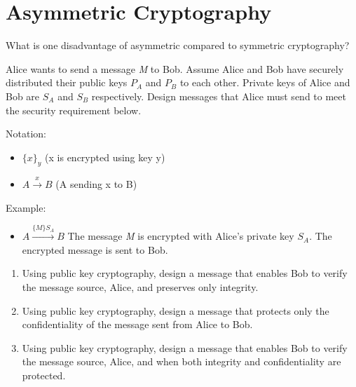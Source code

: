 \newpage
\section{Asymmetric Cryptography}

 {What is one disadvantage of asymmetric compared to symmetric cryptography?}\eprob
\vspace*{0.5in}


Alice wants to send a message \textit{M} to Bob. Assume Alice and Bob
have securely distributed their public keys $P_A$ and $P_B$ to
each other. Private keys of Alice and Bob are $S_A$ and $S_B$
respectively. Design messages that Alice must send to meet the security
requirement below.

Notation: 
\begin{itemize}
\item $\{x\}_y$ (x is encrypted using key y) 
\item $A \xrightarrow{x} B$ (A sending x to B)
\end{itemize}

Example:
\begin{itemize}
\item $A \xrightarrow{\{M\}{S_A}} B$ The message
  \textit{M} is encrypted with Alice's private
  key $S_A$. The encrypted message is sent to Bob.
\end{itemize}

\begin{enumerate}

\item Using public key cryptography, design a message that enables Bob to
verify the message source, Alice, and preserves only integrity.


\item Using public key cryptography, design a message that protects only the
confidentiality of the message sent from Alice to Bob.


\item Using public key cryptography, design a message that enables Bob to
verify the message source, Alice, and when both integrity and
confidentiality are protected.


\end{enumerate}
\eprob





